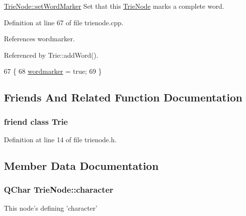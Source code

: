 \hyperlink{class_trie_node_a402a938aeaf7f2b4dcd573e1949c55d4}{Trie\-Node\-::set\-Word\-Marker} Set that this \hyperlink{class_trie_node}{Trie\-Node} marks a complete word. 



Definition at line 67 of file trienode.\-cpp.



References wordmarker.



Referenced by Trie\-::add\-Word().


\begin{DoxyCode}
67                              \{
68     \hyperlink{class_trie_node_acbd36bc970f70dcbde62e63211daa8d7}{wordmarker} = \textcolor{keyword}{true};
69 \}
\end{DoxyCode}


\subsection{Friends And Related Function Documentation}
\hypertarget{class_trie_node_ae2e1f78809fe1c494cec561704ad5efb}{
\subsubsection[{Trie}]{\setlength{\rightskip}{0pt plus 5cm}friend class {\bf Trie}\hspace{0.3cm}{\ttfamily [friend]}}}\label{class_trie_node_ae2e1f78809fe1c494cec561704ad5efb}


Definition at line 14 of file trienode.\-h.



\subsection{Member Data Documentation}
\hypertarget{class_trie_node_a916f69076dcca89e4e7963cea715b730}{
\subsubsection[{character}]{\setlength{\rightskip}{0pt plus 5cm}Q\-Char Trie\-Node\-::character\hspace{0.3cm}{\ttfamily [private]}}}\label{class_trie_node_a916f69076dcca89e4e7963cea715b730}
This node's defining 'character' 

